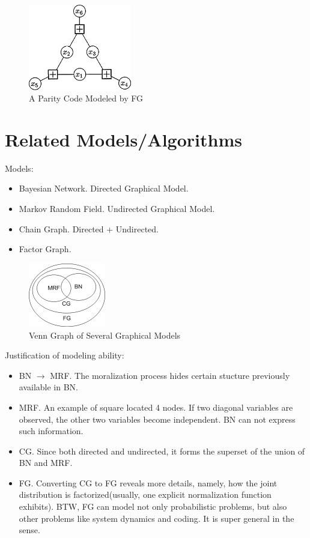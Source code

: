 \documentclass[11pt,a4paper]{article}
\begin{document}
\begin{figure}[htb]
\centering
	\includegraphics[width=0.4\textwidth]{fig/kschischang2001-parity}
	\caption{A Parity Code Modeled by FG\cite{kschischang2001factor}}
\end{figure}




\section{Related Models/Algorithms}

Models:
\begin{itemize}
	\item Bayesian Network. Directed Graphical Model. 
	\item Markov Random Field. Undirected Graphical Model.
	\item Chain Graph. Directed + Undirected.  
	\item Factor Graph. 
\end{itemize}

\begin{figure}[htb]
\centering
	\includegraphics[width=0.3\textwidth]{illustration/graphical-venn.png}
	\caption{Venn Graph of Several Graphical Models}
\end{figure}

Justification of modeling ability:
\begin{itemize}
	\item BN $\rightarrow$ MRF. The moralization process hides certain stucture 
	previously available in BN. 
	\item MRF. An example of square located 4 nodes. If two diagonal variables 
	are observed, the other two variables become independent. BN can not express 
	such information. 
	\item CG. Since both directed and undirected, it forms the superset of 
	the union of BN and	MRF.
	\item FG. Converting CG to FG reveals more details, namely, how the joint 
	distribution is factorized(usually, one explicit normalization function 
	exhibits). BTW, FG can model not only probabilistic problems, but also 
	other problems like system dynamics and coding. It is super general in the
	sense.
\end{itemize}
\end{document}
